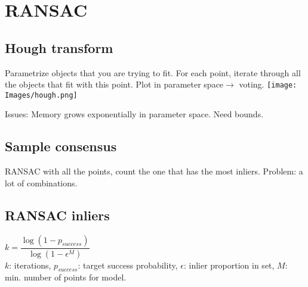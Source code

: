 \section{RANSAC}
\subsection*{Hough transform}
Parametrize objects that you are trying to fit. For each point, iterate
through all the objects that fit with this point. Plot in
parameter space$\rightarrow$ voting.
\texttt{[image: Images/hough.png]}

\alert{Issues:} Memory grows exponentially in parameter space. Need bounds.

\subsection*{Sample consensus}
RANSAC with all the points, count the one that has the most inliers.
\alert{Problem}: a lot of combinations.

\subsection*{RANSAC inliers}
$k = \dfrac{\log(1 - p_{success})}{\log(1 - \epsilon^M)}$\\
$k$: iterations, $p_{success}$: target success probability,
$\epsilon$: inlier proportion in set, $M$: min. number of points for
model.

